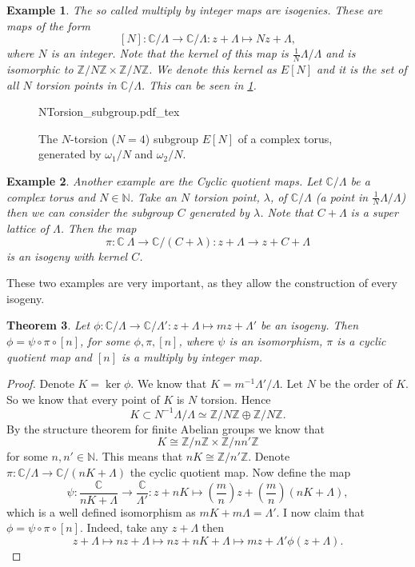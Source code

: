 \documentclass[titlepage,a4paper]{article}
\newcommand{\incfig}[1]{%
	\def\svgwidth{\columnwidth}
	{#1.pdf_tex}
}
\theoremstyle{theoremdd}
\newtheorem{theorem}{Theorem}[section]
\theoremstyle{definitiondd}
\theoremstyle{remarkdd}
\newtheorem{example}[theorem]{Example}
\newcommand{\N}{\mathbb{N}}
\newcommand{\Z}{\mathbb{Z}}
\newcommand{\C}{\mathbb{C}}
\begin{document}
\begin{example}
	The so called \emph{multiply by integer maps} are isogenies. These are maps of the form \[
		[N]: \C / \Lambda \to \C / \Lambda: z + \Lambda \mapsto  Nz + \Lambda
	,\] where $N$ is an integer. 
	Note that the kernel of this map is $\frac{1}{N}\Lambda / \Lambda$ and is isomorphic to $\Z / N \Z \times  \Z / N \Z$. We denote this kernel as $E[N]$ and it is the set of all $N$ torsion points in $\C / \Lambda$. This can be seen in \cref{fig:Ntorsion_subgroup}.
\end{example}
	\begin{figure}[h]
		\incfig{NTorsion_subgroup}	
		\caption{The $N$-torsion ($N = 4$) subgroup $E[N]$ of a complex torus, generated by  $\omega_1 / N$ and $\omega_2 / N$.}
		\label{fig:Ntorsion_subgroup}
	\end{figure}
\begin{example}
	Another example are the \emph{Cyclic quotient maps}. 
	Let  $\C / \Lambda$ be a complex torus and  $N \in \N$.
	Take an $N$ torsion point, $\lambda$, of $\C / \Lambda$ (a point in $\frac{1}{N} \Lambda / \Lambda$) then we can consider the subgroup $C$ generated by $\lambda$. Note that $C + \Lambda$ is a super lattice of $\Lambda$. Then the map \[
		\pi: \C \ \Lambda \to \C / (C + \lambda): z + \Lambda \to z + C + \Lambda
	\]  
	is an isogeny with kernel $C$. 
\end{example}

These two examples are very important, as they allow the construction of every isogeny. 
\begin{theorem}
	Let $\phi: \C / \Lambda \to \C / \Lambda': z + \Lambda \mapsto mz + \Lambda'$ be an isogeny. Then $\phi = \psi \circ \pi \circ [n]$, for some $\phi, \pi, [n]$, where  $\psi$ is an isomorphism, $\pi$ is a cyclic quotient map and $[n]$ is a multiply by integer map.
\end{theorem}
\begin{proof}
	Denote $K = \ker \phi$. We know that $K = m^{-1} \Lambda' / \Lambda$.
	Let $N$ be the order of $K$. So we know that every point of $K$ is $N$ torsion. 
	Hence \[
		K \subset N^{-1} \Lambda / \Lambda \simeq \Z / N \Z \oplus \Z / N \Z. 
	\]
	By the structure theorem for finite Abelian groups we know that  \[
	K \cong \Z / n \Z \times \Z / n n' \Z
	\]
	for some $n, n'\in \N$. 
	This means that $nK \cong \Z / n' \Z$. Denote $\pi: \C / \Lambda \to \C / (nK + \Lambda)$ the cyclic quotient map. Now define the map \[
		\psi: \frac{\C}{nK + \Lambda} \to \frac{\C}{\Lambda'}: z + nK \mapsto  \left(\frac{m}{n}\right) z + \left( \frac{m}{n} \right)(nK + \Lambda)
	,\] 
	which is a well defined isomorphism as $mK + m\Lambda = \Lambda'$. 
	I now claim that $\phi = \psi \circ \pi \circ [n]$. Indeed, take any $z + \Lambda$ then \[
		z + \Lambda \mapsto nz + \Lambda \mapsto  nz + nK + \Lambda \mapsto  mz + \Lambda' \phi(z + \Lambda)
	.\]  
\end{proof}
\end{document}
